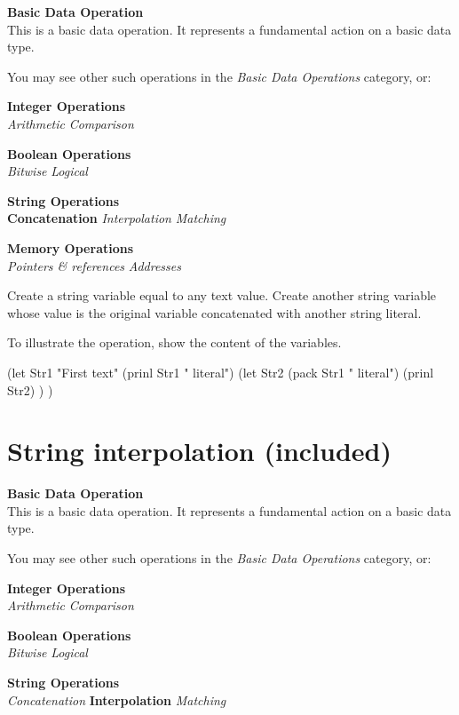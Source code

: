 \begin{itemize}
\textbf{Basic Data Operation}\\ This is a basic data operation. It
represents a fundamental action on a basic data type.

You may see other such operations in the
\emph{Basic Data Operations}
category, or:

\textbf{Integer Operations} \\
\emph{Arithmetic} \textbar{}
\emph{Comparison}

\textbf{Boolean Operations} \\ \emph{Bitwise}
\textbar{} \emph{Logical}

\textbf{String Operations} \\ \textbf{Concatenation} \textbar{}
\emph{Interpolation} \textbar{}
\emph{Matching}

\textbf{Memory Operations} \\
\emph{Pointers \& references}
\textbar{} \emph{Addresses}

Create a string variable equal to any text value. Create another string
variable whose value is the original variable concatenated with another
string literal.

To illustrate the operation, show the content of the variables.

\begin{wideverbatim}

(let Str1 "First text"
   (prinl Str1 " literal")
   (let Str2 (pack Str1 " literal")
      (prinl Str2) ) )

\end{wideverbatim}

\pagebreak{}
\section*{String interpolation (included)}


\textbf{Basic Data Operation}\\ This is a basic data operation. It
represents a fundamental action on a basic data type.

You may see other such operations in the
\emph{Basic Data Operations}
category, or:

\textbf{Integer Operations} \\
\emph{Arithmetic} \textbar{}
\emph{Comparison}

\textbf{Boolean Operations} \\ \emph{Bitwise}
\textbar{} \emph{Logical}

\textbf{String Operations} \\
\emph{Concatenation} \textbar{}
\textbf{Interpolation} \textbar{}
\emph{Matching}


\end{itemize}
